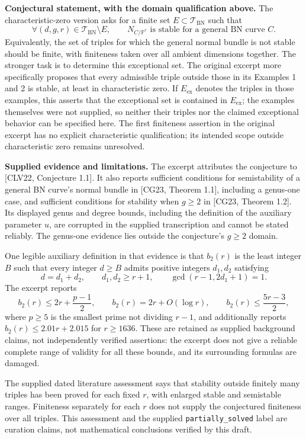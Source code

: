 \documentclass[11pt]{article}
\newcommand{\PP}{\mathbb{P}}
\begin{document}
\textbf{Conjectural statement, with the domain qualification above.} The characteristic-zero version asks for a finite set \(E\subset\mathcal T_{\mathrm{BN}}\) such that
\[
\forall(d,g,r)\in\mathcal T_{\mathrm{BN}}\setminus E,
\qquad N_{C/\PP^r}\text{ is stable for a general BN curve }C.
\]
Equivalently, the set of triples for which the general normal bundle is not stable should be finite, with finiteness taken over all ambient dimensions together. The stronger task is to determine this exceptional set. The original excerpt more specifically proposes that every admissible triple outside those in its Examples 1 and 2 is stable, at least in characteristic zero. If \(E_{\mathrm{ex}}\) denotes the triples in those examples, this asserts that the exceptional set is contained in \(E_{\mathrm{ex}}\); the examples themselves were not supplied, so neither their triples nor the claimed exceptional behavior can be specified here. The first finiteness assertion in the original excerpt has no explicit characteristic qualification; its intended scope outside characteristic zero remains unresolved.

\textbf{Supplied evidence and limitations.} The excerpt attributes the conjecture to [CLV22, Conjecture 1.1]. It also reports sufficient conditions for semistability of a general BN curve's normal bundle in [CG23, Theorem 1.1], including a genus-one case, and sufficient conditions for stability when \(g\geq2\) in [CG23, Theorem 1.2]. Its displayed genus and degree bounds, including the definition of the auxiliary parameter \(u\), are corrupted in the supplied transcription and cannot be stated reliably. The genus-one evidence lies outside the conjecture's \(g\geq2\) domain.

One legible auxiliary definition in that evidence is that \(b_2(r)\) is the least integer \(B\) such that every integer \(d\geq B\) admits positive integers \(d_1,d_2\) satisfying
\[
d=d_1+d_2,\qquad d_1,d_2\geq r+1,\qquad\gcd(r-1,2d_1+1)=1.
\]
The excerpt reports
\[
b_2(r)\leq2r+\frac{p-1}{2},\qquad
b_2(r)=2r+O(\log r),\qquad
b_2(r)\leq\frac{5r-3}{2},
\]
where \(p\geq5\) is the smallest prime not dividing \(r-1\), and additionally reports \(b_2(r)\leq2.01r+2.015\) for \(r\geq1636\). These are retained as supplied background claims, not independently verified assertions: the excerpt does not give a reliable complete range of validity for all these bounds, and its surrounding formulas are damaged.

The supplied dated literature assessment says that stability outside finitely many triples has been proved for each fixed \(r\), with enlarged stable and semistable ranges. Finiteness separately for each \(r\) does not supply the conjectured finiteness over all triples. This assessment and the supplied \texttt{partially\_solved} label are curation claims, not mathematical conclusions verified by this draft.
\end{document}
